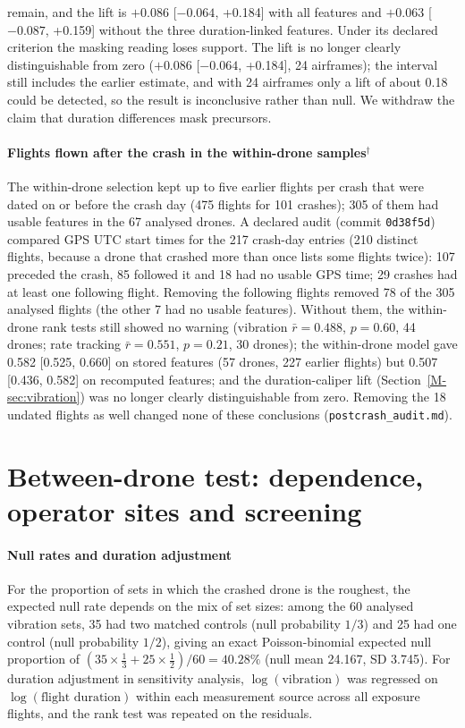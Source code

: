 \documentclass[preprint,12pt]{elsarticle}
\begin{document}
remain, and the lift is $+0.086$ [$-0.064$, +0.184] with all features and $+0.063$ [$-0.087$, +0.159] without the three duration-linked features. Under its declared criterion the masking reading loses support. The lift is no longer clearly distinguishable from zero ($+0.086$ [$-0.064$, +0.184], 24 airframes); the interval still includes the earlier estimate, and with 24 airframes only a lift of about 0.18 could be detected, so the result is inconclusive rather than null. We withdraw the claim that duration differences mask precursors.

\paragraph{Flights flown after the crash in the within-drone samples$^\dagger$}
\label{sup:postcrash}
The within-drone selection kept up to five earlier flights per crash that were dated on or before the crash day (475 flights for 101 crashes); 305 of them had usable features in the 67 analysed drones. A declared audit (commit \texttt{0d38f5d}) compared GPS UTC start times for the 217 crash-day entries (210 distinct flights, because a drone that crashed more than once lists some flights twice): 107 preceded the crash, 85 followed it and 18 had no usable GPS time; 29 crashes had at least one following flight. Removing the following flights removed 78 of the 305 analysed flights (the other 7 had no usable features). Without them, the within-drone rank tests still showed no warning (vibration $\bar r=0.488$, $p=0.60$, 44 drones; rate tracking $\bar r=0.551$, $p=0.21$, 30 drones); the within-drone model gave 0.582 [0.525, 0.660] on stored features (57 drones, 227 earlier flights) but 0.507 [0.436, 0.582] on recomputed features; and the duration-caliper lift (Section~\ref{M-sec:vibration}) was no longer clearly distinguishable from zero. Removing the 18 undated flights as well changed none of these conclusions (\texttt{postcrash\_audit.md}).
\FloatBarrier

\section{Between-drone test: dependence, operator sites and screening}
\label{sup:between}
\paragraph{Null rates and duration adjustment} For the proportion of sets in which the crashed drone is the roughest, the expected
null rate depends on the mix of set sizes: among the 60 analysed vibration sets, 35 had two matched controls (null
probability $1/3$) and 25 had one control (null probability $1/2$), giving an exact Poisson-binomial expected null
proportion of $(35 \times \frac{1}{3} + 25 \times \frac{1}{2})/60 = 40.28\%$ (null mean 24.167, SD 3.745). For duration
adjustment in sensitivity analysis, $\log(\text{vibration})$ was regressed on $\log(\text{flight duration})$ within each
measurement source across all exposure flights, and the rank test was repeated on the residuals.
\end{document}
